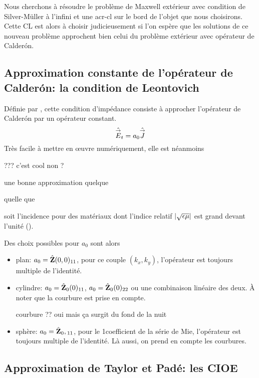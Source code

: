   Nous cherchons à résoudre le problème de Maxwell extérieur avec condition de Silver-Müller à l'infini et une \gls{acr-cl} sur le bord de l'objet que nous choisirons.
  Cette CL est alors à choisir judicieusement si l'on espère que les solutions de ce nouveau problème approchent bien celui du problème extérieur avec opérateur de Calderón.

  \subsection{Approximation constante de l'opérateur de Calderón: la condition de Leontovich}
        
    Définie par \cite{leontovich_investigations_1948}, cette condition d'impédance consiste à approcher l'opérateur de Calderón par un opérateur constant.
    \[
      \hat{{\overset{\rightarrow}{E}}}_t = a_0 \hat {{\overset{\rightarrow}{J}}}
    \]
    Très facile à mettre en œuvre numériquement, elle est néanmoins
    \begin{REM}
  ??? c'est cool non ?
\end{REM} une bonne approximation quelque\begin{REM}
  quelle que
\end{REM} soit l'incidence pour des matériaux dont l'indice relatif \(|\sqrt{\epsilon\mu}|\) est grand devant l'unité (\cite[par.~3, p.421-422]{senior_impedance_1960}).

    Des choix possibles pour \(a_0\) sont alors
    \begin{itemize}
      \item plan: \(a_0 = \hat{\mathbf{Z}}(0,0)_{11}\), pour ce couple \((k_x,k_y)\), l'opérateur est toujours multiple de l'identité.
      \item cylindre: \(a_0 = \hat{\mathbf{Z}}_0(0)_{11}\), \(a_0 = \hat{\mathbf{Z}}_0(0)_{22}\) ou une combinaison linéaire des deux. À noter que la courbure est prise en compte.
      \begin{REM}
  courbure ?? oui mais ça surgit du fond de la nuit
\end{REM}
      \item sphère: \(a_0 = \hat{\mathbf{Z}}_0,{}_{11}\), pour le 1\ier coefficient de la série de Mie, l'opérateur est toujours multiple de l'identité. Là aussi, on prend en compte les courbures.
    \end{itemize}

  \subsection{Approximation de Taylor et Padé: les CIOE}

